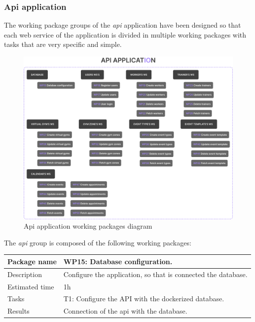 \documentclass[a4paper, 12pt, oneside]{book}
\begin{document}
\subsubsection{Api application}
\label{working-packages-api}
The working package groups of the \emph{api} application have been designed so that each web service of the application is divided in multiple working packages with tasks that are very specific and simple.
\begin{figure}[H]
	\centering
	\includegraphics[width=\textwidth]{assets/working-packages/Api.png}
	\caption{Api application working packages diagram}
\end{figure}
The \emph{api} group is composed of the following working packages:
\\[8pt]
\begin{tabularx}{\textwidth}{| l | X |}
	\hline
	\rowcolor{rowColor}
	{\semibf Package name}   & {\semibf WP15}: Database configuration.                       \\
	\hline
	{\semibf Description}    & Configure the application, so that is connected the database.  \\
	\hline
	\rowcolor{rowColor}
	{\semibf Estimated time} & 1h                                                            \\
	\hline
	{\semibf Tasks}          & {\semibf T1}: Configure the API with the dockerized database. \\
	\hline
	\rowcolor{rowColor}
	{\semibf Results}        & Connection of the api with the database.                      \\
	\hline
\end{tabularx}
\end{document}
